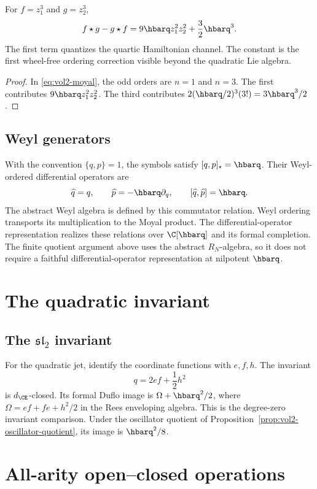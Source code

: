 \begin{calculation}
For $f=z_1^3$ and $g=z_2^3$,
\[
 f\star g-g\star f
 =9\hbarq z_1^2z_2^2+\frac32\hbarq^3.
\]
The first term quantizes the quartic Hamiltonian channel.  The constant is the first wheel-free ordering correction visible beyond the quadratic Lie algebra.
\end{calculation}
\begin{proof}
In \eqref{eq:vol2-moyal}, the odd orders are $n=1$ and $n=3$.  The first contributes $9\hbarq z_1^2z_2^2$.  The third contributes $2(\hbarq/2)^3(3!)=3\hbarq^3/2$.
\end{proof}

\section{Weyl generators}
With the convention $\{q,p\}=1$, the symbols satisfy
$[q,p]_\star=\hbarq$.
Their Weyl-ordered differential operators are
\[
 \widehat q=q,\qquad \widehat p=-\hbarq\partial_q,
 \qquad [\widehat q,\widehat p]=\hbarq.
\]
The abstract Weyl algebra is defined by this commutator relation.
Weyl ordering transports its multiplication to the Moyal product.
The differential-operator representation realizes these relations over
$\C[\hbarq]$ and its formal completion.
The finite quotient argument above uses the abstract $R_N$-algebra,
so it does not require a faithful differential-operator representation at nilpotent $\hbarq$.

\chapter{The quadratic invariant}
\section{The \texorpdfstring{$\mathfrak{sl}_2$}{sl2} invariant}
For the quadratic jet, identify the coordinate functions with $e,f,h$.  The invariant
\[
 q=2ef+\frac12h^2
\]
is $d_{\CE}$-closed.  Its formal Duflo image is $\Omega+\hbarq^2/2$, where $\Omega=ef+fe+h^2/2$ in the Rees enveloping algebra.  This is the degree-zero invariant comparison.  Under the oscillator quotient of Proposition~\ref{prop:vol2-oscillator-quotient}, its image is $\hbarq^2/8$.

\chapter{All-arity open--closed operations}
